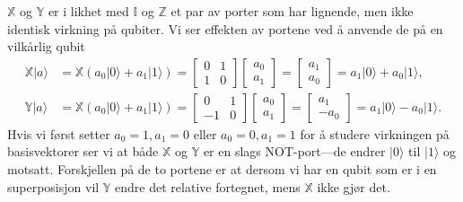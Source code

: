 $\mathbb{X}$ og $\mathbb{Y}$ er i likhet med $\mathbb{I}$ og $\mathbb{Z}$ et par av porter som har lignende, men ikke identisk virkning på qubiter. Vi ser effekten av portene ved å anvende de på en vilkårlig qubit
\begin{align*}
	\mathbb{X}|a\rangle &= \mathbb{X}(a_0|0\rangle + a_1|1\rangle)= \left[\begin{array}{rr}0 & 1 \\ 1 & 0 \end{array}\right]\left[\begin{array}{r} a_0 \\ a_1\end{array}\right] 
	= \left[\begin{array}{r} a_1 \\ a_0\end{array}\right] = a_1|0\rangle + a_0|1\rangle, \\
	\mathbb{Y}|a\rangle &= \mathbb{X}(a_0|0\rangle + a_1|1\rangle)= \left[\begin{array}{rr}0 & 1 \\ -1 & 0 \end{array}\right]\left[\begin{array}{r} a_0 \\ a_1\end{array}\right] 
	= \left[\begin{array}{r} a_1 \\ -a_0\end{array}\right] = a_1|0\rangle - a_0|1\rangle.
\end{align*}
Hvis vi først setter $a_0=1, a_1=0$ eller $a_0=0, a_1=1$ for å studere virkningen på basisvektorer ser vi at både $\mathbb{X}$ og $\mathbb{Y}$ er en slags NOT-port---de endrer $|0\rangle$ til $|1\rangle$ og motsatt. Forskjellen på de to portene er at dersom vi har en qubit som er i en superposisjon vil $\mathbb{Y}$ endre det relative fortegnet, mens $\mathbb{X}$ ikke gjør det.

